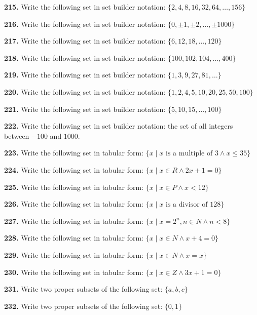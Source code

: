 \documentclass[11pt]{article}
\begin{document}
\bigskip
\noindent\textbf{215.} Write the following set in set builder notation: $\{2,4,8,16,32,64,\ldots,156\}$

\bigskip
\noindent\textbf{216.} Write the following set in set builder notation: $\{0,\pm1,\pm2,\ldots,\pm1000\}$

\bigskip
\noindent\textbf{217.} Write the following set in set builder notation: $\{6,12,18,\ldots,120\}$

\bigskip
\noindent\textbf{218.} Write the following set in set builder notation: $\{100,102,104,\ldots,400\}$

\bigskip
\noindent\textbf{219.} Write the following set in set builder notation: $\{1,3,9,27,81,\ldots\}$

\bigskip
\noindent\textbf{220.} Write the following set in set builder notation: $\{1,2,4,5,10,20,25,50,100\}$

\bigskip
\noindent\textbf{221.} Write the following set in set builder notation: $\{5,10,15,\ldots,100\}$

\bigskip
\noindent\textbf{222.} Write the following set in set builder notation: the set of all integers between $-100$ and $1000$.

\bigskip
\noindent\textbf{223.} Write the following set in tabular form: $\{x \mid x \text{ is a multiple of } 3 \land x\leq35\}$

\bigskip
\noindent\textbf{224.} Write the following set in tabular form: $\{x \mid x\in R \land 2x+1=0\}$

\bigskip
\noindent\textbf{225.} Write the following set in tabular form: $\{x \mid x\in P \land x <12\}$

\bigskip
\noindent\textbf{226.} Write the following set in tabular form: $\{x \mid x \text{ is a divisor of } 128\}$

\bigskip
\noindent\textbf{227.} Write the following set in tabular form: $\{x \mid x=2^n, n\in N \land n <8\}$

\bigskip
\noindent\textbf{228.} Write the following set in tabular form: $\{x \mid x\in N \land x+4=0\}$

\bigskip
\noindent\textbf{229.} Write the following set in tabular form: $\{x \mid x\in N \land x = x\}$

\bigskip
\noindent\textbf{230.} Write the following set in tabular form: $\{x \mid x\in Z \land 3x+1=0\}$

\bigskip
\noindent\textbf{231.} Write two proper subsets of the following set: $\{a,b,c\}$

\bigskip
\noindent\textbf{232.} Write two proper subsets of the following set: $\{0,1\}$
\end{document}
